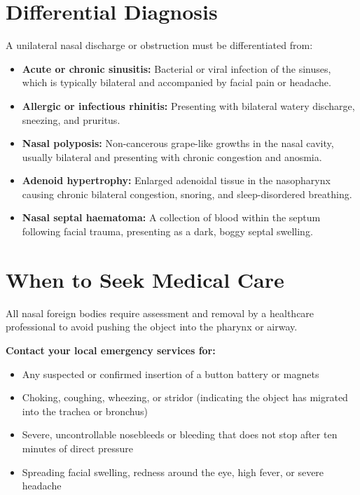\section*{Differential Diagnosis}
A unilateral nasal discharge or obstruction must be differentiated from:
\begin{itemize}
    \item \textbf{Acute or chronic sinusitis:} Bacterial or viral infection of the sinuses, which is typically bilateral and accompanied by facial pain or headache.
    \item \textbf{Allergic or infectious rhinitis:} Presenting with bilateral watery discharge, sneezing, and pruritus.
    \item \textbf{Nasal polyposis:} Non-cancerous grape-like growths in the nasal cavity, usually bilateral and presenting with chronic congestion and anosmia.
    \item \textbf{Adenoid hypertrophy:} Enlarged adenoidal tissue in the nasopharynx causing chronic bilateral congestion, snoring, and sleep-disordered breathing.
    \item \textbf{Nasal septal haematoma:} A collection of blood within the septum following facial trauma, presenting as a dark, boggy septal swelling.
\end{itemize}

\section*{When to Seek Medical Care}
All nasal foreign bodies require assessment and removal by a healthcare professional to avoid pushing the object into the pharynx or airway.

\textbf{Contact your local emergency services for:}
\begin{itemize}
    \item Any suspected or confirmed insertion of a button battery or magnets
    \item Choking, coughing, wheezing, or stridor (indicating the object has migrated into the trachea or bronchus)
    \item Severe, uncontrollable nosebleeds or bleeding that does not stop after ten minutes of direct pressure
    \item Spreading facial swelling, redness around the eye, high fever, or severe headache
\end{itemize}

